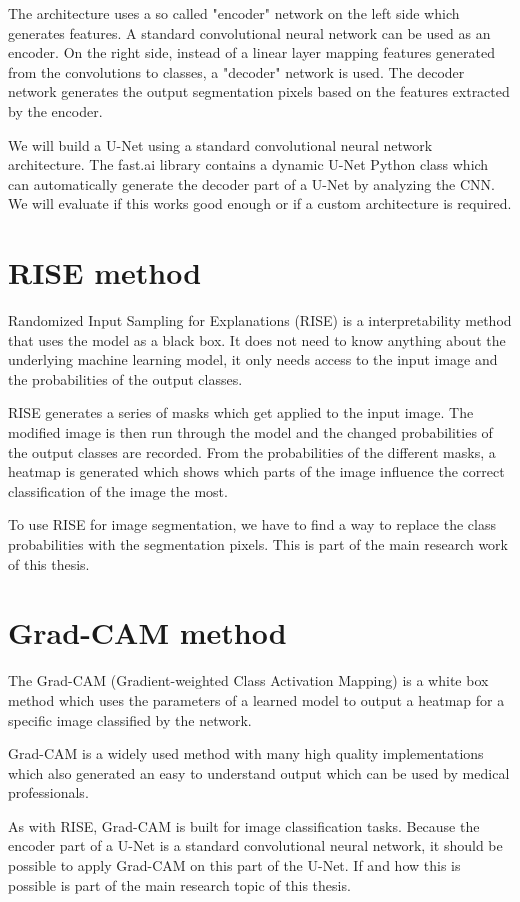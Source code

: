 The architecture uses a so called "encoder" network on the left side which generates features. A standard convolutional neural network can be used as an encoder. On the right side, instead of a linear layer mapping features generated from the convolutions to classes, a "decoder" network is used. The decoder network generates the output segmentation pixels based on the features extracted by the encoder.

We will build a U-Net using a standard convolutional neural network architecture. The fast.ai library contains a dynamic U-Net Python class which can automatically generate the decoder part of a U-Net by analyzing the CNN. We will evaluate if this works good enough or if a custom architecture is required.

\section{RISE method}
Randomized Input Sampling for Explanations (RISE) is a interpretability method that uses the model as a black box. It does not need to know anything about the underlying machine learning model, it only needs access to the input image and the probabilities of the output classes.

RISE generates a series of masks which get applied to the input image. The modified image is then run through the model and the changed probabilities of the output classes are recorded. From the probabilities of the different masks, a heatmap is generated which shows which parts of the image influence the correct classification of the image the most.

To use RISE for image segmentation, we have to find a way to replace the class probabilities with the segmentation pixels. This is part of the main research work of this thesis.


\section{Grad-CAM method}
The Grad-CAM \cite{selvaraju2017grad} (Gradient-weighted Class Activation Mapping) is a white box method which uses the parameters of a learned model to output a heatmap for a specific image classified by the network.

Grad-CAM is a widely used method with many high quality implementations which also generated an easy to understand output which can be used by medical professionals.

As with RISE, Grad-CAM is built for image classification tasks. Because the encoder part of a U-Net is a standard convolutional neural network, it should be possible to apply Grad-CAM on this part of the U-Net. If and how this is possible is part of the main research topic of this thesis.


